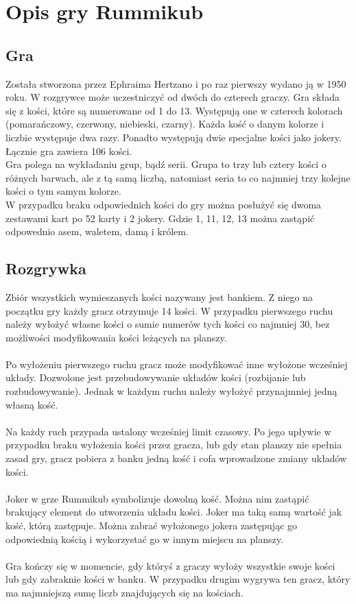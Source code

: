 \chapter{Opis gry Rummikub}
\thispagestyle{chapterBeginStyle}
\label{rozdzial1}

\section{Gra}

Została stworzona przez Ephraima Hertzano i po raz pierwszy wydano ją w 1950 roku. W rozgrywce może uczestniczyć od dwóch do czterech graczy. Gra składa się z kości, które są numerowane od 1 do 13. Występują one w czterech kolorach (pomarańczowy, czerwony, niebieski, czarny). Każda kość o danym kolorze i liczbie występuje dwa razy. Ponadto występują dwie specjalne kości jako jokery. Łącznie gra zawiera 106 kości. \\

Gra polega na wykładaniu grup, bądź serii. Grupa to trzy lub cztery kości o różnych barwach, ale z tą samą liczbą, natomiast seria to co najmniej trzy kolejne kości o tym samym kolorze. \\

W przypadku braku odpowiednich kości do gry można posłużyć się dwoma zestawami kart po 52 karty i 2 jokery. Gdzie 1, 11, 12, 13 można zastąpić odpowednio asem, waletem, damą i królem.

\section{Rozgrywka}

Zbiór wszystkich wymieszanych kości nazywany jest bankiem. Z niego na początku gry każdy gracz otrzymuje 14 kości. W przypadku pierwszego ruchu należy wyłożyć własne kości o sumie numerów tych kości co najmniej 30, bez możliwości modyfikowania kości leżących na planszy. \\ \\
Po wyłożeniu pierwszego ruchu gracz może modyfikować inne wyłożone wcześniej układy. Dozwolone jest przebudowywanie układów kości (rozbijanie lub rozbudowywanie). Jednak w każdym ruchu należy wyłożyć przynajmniej jedną własną kość. \\ \\
Na każdy ruch przypada ustalony wcześniej limit czasowy. Po jego upływie w przypadku braku wyłożenia kości przez gracza, lub gdy stan planszy nie spełnia zasad gry, gracz pobiera z banku jedną kość i cofa wprowadzone zmiany układów kości. \\ \\
Joker w grze Rummikub symbolizuje dowolną kość. Można nim zastąpić brakujący element do utworzenia układu kości. Joker ma taką samą wartość jak kość, którą zastępuje. Można zabrać wyłożonego jokera zastępując go odpowiednią kością i wykorzystać go w innym miejscu na planszy. \\ \\
Gra kończy się w momencie, gdy któryś z graczy wyłoży wszystkie swoje kości lub gdy zabraknie kości w banku. W przypadku drugim wygrywa ten gracz, który ma najmniejszą sumę liczb znajdujących się na kościach.


